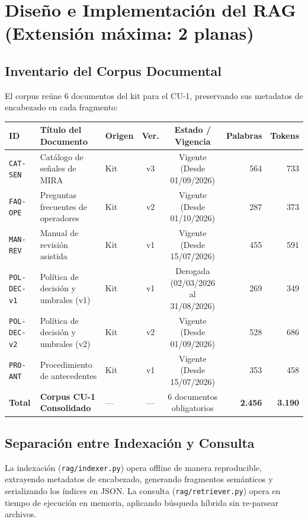 \documentclass[11pt,letterpaper]{article}
\begin{document}
\newpage

\section{Diseño e Implementación del RAG (Extensión máxima: 2 planas)}

\subsection{Inventario del Corpus Documental}
El corpus reúne 6 documentos del kit para el CU-1, preservando sus metadatos de encabezado en cada fragmento:
\begin{table}[h!]
\small\centering
\begin{tabularx}{\textwidth}{lXYccrr}
\toprule
\textbf{ID} & \textbf{Título del Documento} & \textbf{Origen} & \textbf{Ver.} & \textbf{Estado / Vigencia} & \textbf{Palabras} & \textbf{Tokens} \\
\midrule
\texttt{CAT-SEN} & Catálogo de señales de MIRA & Kit & v3 & Vigente (Desde 01/09/2026) & 564 & 733 \\
\texttt{FAQ-OPE} & Preguntas frecuentes de operadores & Kit & v2 & Vigente (Desde 01/10/2026) & 287 & 373 \\
\texttt{MAN-REV} & Manual de revisión asistida & Kit & v1 & Vigente (Desde 15/07/2026) & 455 & 591 \\
\texttt{POL-DEC-v1} & Política de decisión y umbrales (v1) & Kit & v1 & Derogada (02/03/2026 al 31/08/2026) & 269 & 349 \\
\texttt{POL-DEC-v2} & Política de decisión y umbrales (v2) & Kit & v2 & Vigente (Desde 01/09/2026) & 528 & 686 \\
\texttt{PRO-ANT} & Procedimiento de antecedentes & Kit & v1 & Vigente (Desde 15/07/2026) & 353 & 458 \\
\midrule
\textbf{Total} & \textbf{Corpus CU-1 Consolidado} & — & — & 6 documentos obligatorios & \textbf{2.456} & \textbf{3.190} \\
\bottomrule
\end{tabularx}
\end{table}

\subsection{Separación entre Indexación y Consulta}
La indexación (\texttt{rag/indexer.py}) opera offline de manera reproducible, extrayendo metadatos de encabezado, generando fragmentos semánticos y serializando los índices en JSON. La consulta (\texttt{rag/retriever.py}) opera en tiempo de ejecución en memoria, aplicando búsqueda híbrida sin re-parsear archivos.
\end{document}
